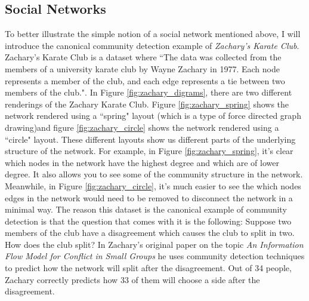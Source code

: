 \subsection{Social Networks}\label{sec:Social Networks}
To better illustrate the simple notion of a social network mentioned above, I will introduce the canonical community detection example of \emph{Zachary's Karate Club}. Zachary's Karate Club is a dataset where ``The data was collected from the members of a university karate club by Wayne Zachary in 1977.  Each node represents a member of the club, and each edge represents a tie between two members of the club."\cite[Metadata]{konect:2017:ucidata-zachary}. In Figure \ref{fig:zachary_digrams}, there are two different renderings of the Zachary Karate Club. Figure \ref{fig:zachary_spring} shows the network rendered using a ``spring" layout (which is a type of force directed graph drawing\cite{kobourov12})and figure \ref{fig:zachary_circle} shows the network rendered using a ``circle" layout. These different layouts show us different parts of the underlying structure of the network.  For example, in Figure \ref{fig:zachary_spring}, it's clear which nodes in the network have the highest degree and which are of lower degree. It also allows you to see some of the community structure in the network. Meanwhile, in Figure \ref{fig:zachary_circle}, it's much easier to see the which nodes edges in the network would need to be removed to disconnect the network in a minimal way. The reason this dataset is the canonical example of community detection is that the question that comes with it is the following: Suppose two members of the club have a disagreement which causes the club to split in two. How does the club split? In Zachary's original paper on the topic \emph{An Information Flow Model for Conflict in Small Groups}\cite{zachary77} he uses community detection techniques to predict how the network will split after the disagreement. Out of 34 people, Zachary correctly predicts how 33 of them will choose a side after the disagreement.

